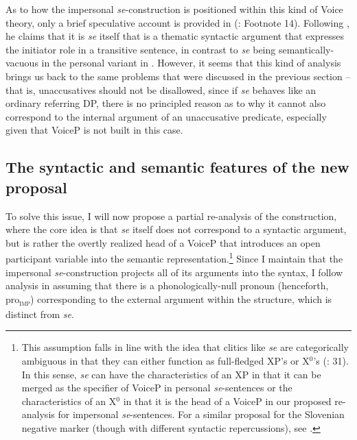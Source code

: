 \documentclass[output=paper,
modfonts,nonflat,
newtxmath
]{langsci/langscibook}
\begin{document}
As to how the impersonal \textit{se}-construction is positioned within this kind of Voice theory, only a brief speculative account is provided in \citeauthor{schaffer2017} (\citeyear{schaffer2017}: Footnote 14). Following \citet{dalessandro2008}, he claims that it is \textit{se} itself that is a thematic syntactic argument that expresses the initiator role in a transitive sentence, in contrast to \textit{se} being semantically-vacuous in the personal variant in . However, it seems that this kind of analysis brings us back to the same problems that were discussed in the previous section – that is, unaccusatives should not be disallowed, since if \textit{se} behaves like an ordinary referring DP, there is no principled reason as to why it cannot also correspond to the internal argument of an unaccusative predicate, especially given that VoiceP is not built in this case.

\subsection{The syntactic and semantic features of the new proposal} \label{SyntacticSemanticProposal}

To solve this issue, I will now propose a partial re-analysis of the construction, where the core idea is that \textit{se} itself does not correspond to a syntactic argument, but is rather the overtly realized head of a VoiceP that introduces an open participant variable into the semantic representation.\footnote{This assumption falls in line with the idea that clitics like \textit{se} are categorically ambiguous in that they can either function as full-fledged XP’s or X$^0$’s (\citealt{boskovic2001}: 31). In this sense, \textit{se} can have the characteristics of an XP in that it can be merged as the specifier of VoiceP in personal \textit{se}-sentences  or the characteristics of an X$^0$ in that it is the head of a VoiceP in our proposed re-analysis for impersonal \textit{se}-sentences. For a similar proposal for the Slovenian negative marker (though with different syntactic repercussions), see \citet{ilc2011}.}  Since I maintain that the impersonal \textit{se}-construction projects all of its arguments into the syntax, I follow  analysis in assuming that there is a phonologically-null pronoun (henceforth, pro\textsubscript{\textsc{imp}}) corresponding to the external argument  within the structure, which is distinct from \textit{se}. \par
\end{document}
